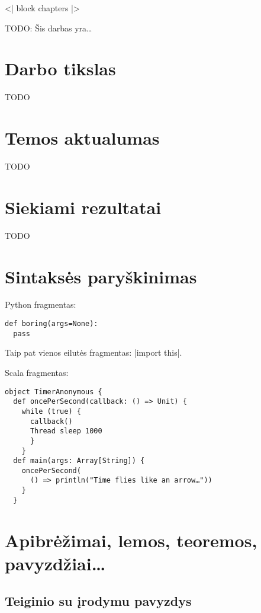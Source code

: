 <| block chapters |>

TODO: Šis darbas yra…

\section{Darbo tikslas}

TODO

\section{Temos aktualumas}

TODO

\section{Siekiami rezultatai}

TODO


\section{Sintaksės paryškinimas}

Python fragmentas:
\begin{verbatim}
def boring(args=None):
  pass
\end{verbatim}

Taip pat vienos eilutės fragmentas: |import this|.

Scala fragmentas:
\begin{verbatim}
object TimerAnonymous {
  def oncePerSecond(callback: () => Unit) {
    while (true) {
      callback()
      Thread sleep 1000
      }
    }
  def main(args: Array[String]) {
    oncePerSecond(
      () => println("Time flies like an arrow…"))
    }
  }
\end{verbatim}

\section{Apibrėžimai, lemos, teoremos, pavyzdžiai…}

\subsection{Teiginio su įrodymu pavyzdys}

